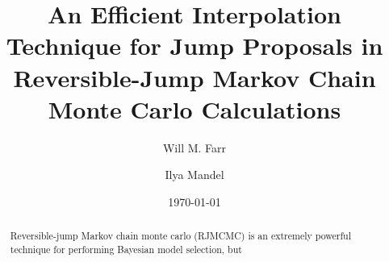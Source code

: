 \documentclass[prd,preprint]{revtex4}
\begin{document}
\title{An Efficient Interpolation Technique for Jump Proposals in
  Reversible-Jump Markov Chain Monte Carlo Calculations}

\date{\today}

\author{Will M. Farr}

\author{Ilya Mandel}


\begin{abstract}
  Reversible-jump Markov chain monte carlo (RJMCMC) is an extremely
  powerful technique for performing Bayesian model selection, but 
\end{abstract}

\maketitle

\nocite{Littenberg2009}


\end{document}
